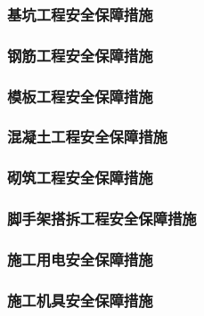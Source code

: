 \subsubsection{基坑工程安全保障措施}

\subsubsection{钢筋工程安全保障措施}

\subsubsection{模板工程安全保障措施}

\subsubsection{混凝土工程安全保障措施}

\subsubsection{砌筑工程安全保障措施}

\subsubsection{脚手架搭拆工程安全保障措施}

\subsubsection{施工用电安全保障措施}

\subsubsection{施工机具安全保障措施}
